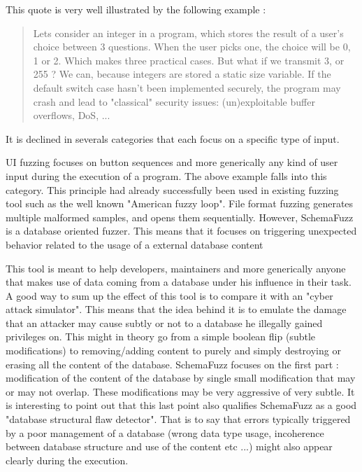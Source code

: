 \documentclass{article}
\begin{document}
\begin{empfile}
This quote is very well illustrated by the following example :
				\begin{quotation}
Lets consider an integer in a program, which stores the result of a user's choice between 3 questions. When the user picks one, the choice will be 0, 1 or 2. Which makes three practical cases. But what if we transmit 3, or 255 ? We can, because integers are stored a static size variable. If the default switch case hasn't been implemented securely, the program may crash and lead to "classical" security issues: (un)exploitable buffer overflows, DoS, ... 
				\end{quotation}

It is declined in severals categories that each focus on a specific type of input.
 
UI fuzzing focuses on button sequences and more generically any kind of user input during the execution of a program. The above example falls into this category.
This principle had already successfully been used in existing fuzzing tool such as the well known "American fuzzy loop".
File format fuzzing generates multiple malformed samples, and opens them sequentially.
However, SchemaFuzz is a database oriented fuzzer. This means that it focuses on triggering unexpected behavior related to the usage of a external database content   

This tool is meant to help developers, maintainers and more generically anyone that makes use of data coming from a database under his influence in their task. A good way to sum up the effect of this tool is to compare it with an "cyber attack simulator".
This means that the idea behind it is to emulate the damage that an attacker may cause subtly or not to a database he illegally gained privileges on. This might in theory go from a simple boolean flip (subtle modifications) to removing/adding content to purely and simply destroying or erasing all the content of the database.
SchemaFuzz focuses on the first part : modification of the content of the database by single small modification that may or may not overlap. These modifications may be very aggressive of very subtle.
It is interesting to point out that this last point also qualifies SchemaFuzz as a good "database structural flaw detector".
That is to say that errors typically triggered by a poor management of a database (wrong data type usage, incoherence between database structure and use of the content etc ...) might also appear clearly during the execution.   

\end{empfile}
\end{document}
